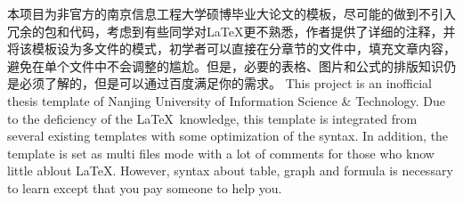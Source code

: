 \abstract
{
本项目为非官方的南京信息工程大学硕博毕业大论文的模板，尽可能的做到不引入冗余的包和代码，考虑到有些同学对\LaTeX 更不熟悉，作者提供了详细的注释，并将该模板设为多文件的模式，初学者可以直接在分章节的文件中，填充文章内容，避免在单个文件中不会调整的尴尬。但是，必要的表格、图片和公式的排版知识仍是必须了解的，但是可以通过百度满足你的需求。
}
{
This project is an inofficial thesis template of Nanjing University of Information Science \& Technology. Due to the deficiency of the \LaTeX~knowledge, this template is integrated from several existing templates with some optimization of the  syntax. In addition, the template is set as multi files mode with a lot of comments for those who know little ablout \LaTeX. However, syntax about table, graph and formula is necessary to learn except that you pay someone to help you.
}